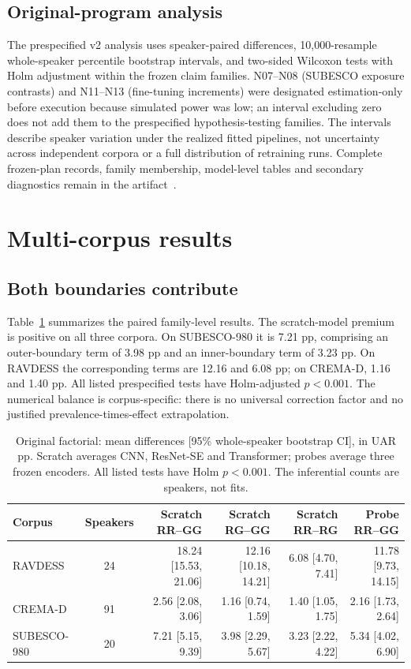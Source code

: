 \documentclass[letterpaper]{article}
\begin{document}
\subsection{Original-program analysis}
The prespecified v2 analysis uses speaker-paired differences, 10,000-resample whole-speaker percentile bootstrap intervals, and two-sided Wilcoxon tests with Holm adjustment within the frozen claim families. N07--N08 (SUBESCO exposure contrasts) and N11--N13 (fine-tuning increments) were designated estimation-only before execution because simulated power was low; an interval excluding zero does not add them to the prespecified hypothesis-testing families. The intervals describe speaker variation under the realized fitted pipelines, not uncertainty across independent corpora or a full distribution of retraining runs. Complete frozen-plan records, family membership, model-level tables and secondary diagnostics remain in the artifact~\cite{artifact}.

\section{Multi-corpus results}
\subsection{Both boundaries contribute}
Table~\ref{tab:factorial} summarizes the paired family-level results. The scratch-model premium is positive on all three corpora. On SUBESCO-980 it is 7.21 pp, comprising an outer-boundary term of 3.98 pp and an inner-boundary term of 3.23 pp. On RAVDESS the corresponding terms are 12.16 and 6.08 pp; on CREMA-D, 1.16 and 1.40 pp. All listed prespecified tests have Holm-adjusted $p<0.001$. The numerical balance is corpus-specific: there is no universal correction factor and no justified prevalence-times-effect extrapolation.

\begin{table}[t]
\centering
\small
\caption{Original factorial: mean differences [95\% whole-speaker bootstrap CI], in UAR pp. Scratch averages CNN, ResNet-SE and Transformer; probes average three frozen encoders. All listed tests have Holm $p<0.001$. The inferential counts are speakers, not fits.}
\label{tab:factorial}
\setlength{\tabcolsep}{5pt}
\begin{tabular}{lcrrrr}\toprule
Corpus & Speakers & Scratch RR--GG & Scratch RG--GG & Scratch RR--RG & Probe RR--GG\\\midrule
RAVDESS & 24 & 18.24 [15.53, 21.06] & 12.16 [10.18, 14.21] & 6.08 [4.70, 7.41] & 11.78 [9.73, 14.15]\\
CREMA-D & 91 & 2.56 [2.08, 3.06] & 1.16 [0.74, 1.59] & 1.40 [1.05, 1.75] & 2.16 [1.73, 2.64]\\
SUBESCO-980 & 20 & 7.21 [5.15, 9.39] & 3.98 [2.29, 5.67] & 3.23 [2.22, 4.22] & 5.34 [4.02, 6.90]\\\bottomrule
\end{tabular}
\end{table}
\end{document}
